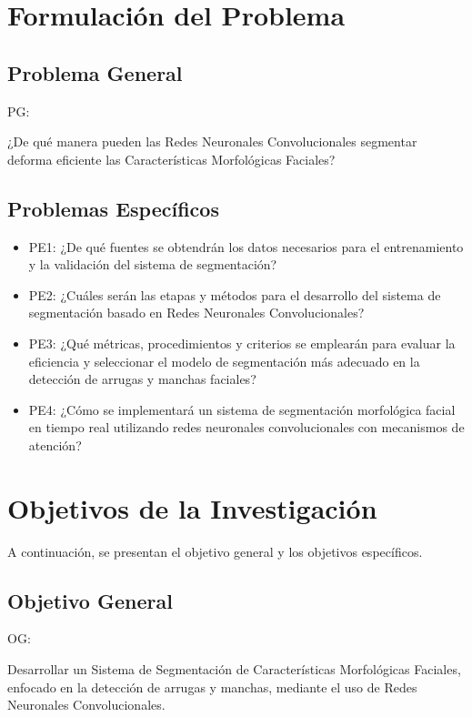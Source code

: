 \section{Formulación del Problema}

\subsection{Problema General}
PG: \newcommand{\ProblemaGeneral}{
¿De qué manera pueden las Redes Neuronales Convolucionales segmentar deforma eficiente las Características Morfológicas Faciales?
}
\ProblemaGeneral

\subsection{Problemas Específicos}
\newcommand{\Pbone}{
¿De qué fuentes se obtendrán los datos necesarios para el entrenamiento y la validación del sistema de segmentación?
}
\newcommand{\Pbtwo}{
¿Cuáles serán las etapas y métodos para el desarrollo del sistema de segmentación basado en Redes Neuronales Convolucionales?
}
\newcommand{\Pbthree}{
¿Qué métricas, procedimientos y criterios se emplearán para evaluar la eficiencia y seleccionar el modelo de segmentación más adecuado en la detección de arrugas y manchas faciales?
}
\newcommand{\Pbfour}{
¿Cómo se implementará un sistema de segmentación morfológica facial en tiempo real utilizando redes neuronales convolucionales con mecanismos de atención?
}

\begin{itemize}
	\item PE1: {\Pbone}
	\item PE2: {\Pbtwo}
	\item PE3: {\Pbthree}
	\item PE4: {\Pbfour}
\end{itemize}

\section{Objetivos de la Investigación}
A continuación, se presentan el objetivo general y los objetivos específicos.
\subsection{Objetivo General}
OG: \newcommand{\ObjetivoGeneral}{
Desarrollar un Sistema de Segmentación de Características Morfológicas Faciales, enfocado en la detección de arrugas y manchas, mediante el uso de Redes Neuronales Convolucionales.
}
\ObjetivoGeneral
